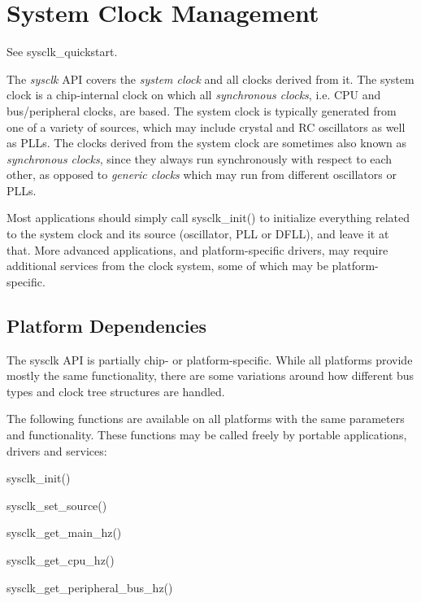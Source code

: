 \hypertarget{group__sysclk__group}{\section{System Clock Management}
\label{group__sysclk__group}
}
See sysclk\-\_\-quickstart.

The {\itshape sysclk} A\-P\-I covers the {\itshape system clock} and all clocks derived from it. The system clock is a chip-\/internal clock on which all {\itshape synchronous clocks}, i.\-e. C\-P\-U and bus/peripheral clocks, are based. The system clock is typically generated from one of a variety of sources, which may include crystal and R\-C oscillators as well as P\-L\-Ls. The clocks derived from the system clock are sometimes also known as {\itshape synchronous clocks}, since they always run synchronously with respect to each other, as opposed to {\itshape generic clocks} which may run from different oscillators or P\-L\-Ls.

Most applications should simply call sysclk\-\_\-init() to initialize everything related to the system clock and its source (oscillator, P\-L\-L or D\-F\-L\-L), and leave it at that. More advanced applications, and platform-\/specific drivers, may require additional services from the clock system, some of which may be platform-\/specific.\hypertarget{group__sysclk__group_sysclk_group_platform}{}\subsection{Platform Dependencies}\label{group__sysclk__group_sysclk_group_platform}
The sysclk A\-P\-I is partially chip-\/ or platform-\/specific. While all platforms provide mostly the same functionality, there are some variations around how different bus types and clock tree structures are handled.

The following functions are available on all platforms with the same parameters and functionality. These functions may be called freely by portable applications, drivers and services\-:
\begin{DoxyItemize}
\item sysclk\-\_\-init()
\item sysclk\-\_\-set\-\_\-source()
\item sysclk\-\_\-get\-\_\-main\-\_\-hz()
\item sysclk\-\_\-get\-\_\-cpu\-\_\-hz()
\item sysclk\-\_\-get\-\_\-peripheral\-\_\-bus\-\_\-hz()
\end{DoxyItemize}

